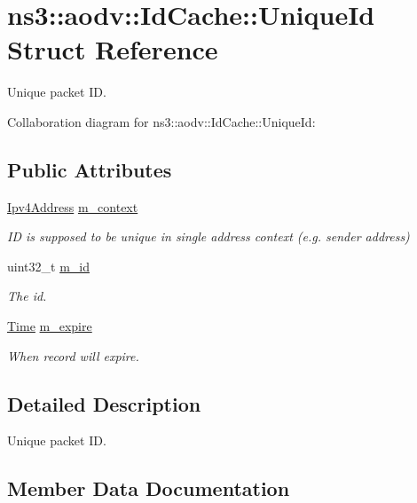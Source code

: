 \hypertarget{structns3_1_1aodv_1_1IdCache_1_1UniqueId}{}\section{ns3\+:\+:aodv\+:\+:Id\+Cache\+:\+:Unique\+Id Struct Reference}
\label{structns3_1_1aodv_1_1IdCache_1_1UniqueId}


Unique packet ID.  




Collaboration diagram for ns3\+:\+:aodv\+:\+:Id\+Cache\+:\+:Unique\+Id\+:
\subsection*{Public Attributes}
\begin{DoxyCompactItemize}
\item 
\hyperlink{classns3_1_1Ipv4Address}{Ipv4\+Address} \hyperlink{structns3_1_1aodv_1_1IdCache_1_1UniqueId_af2e1e7b547b9a93001af9237e2903011}{m\+\_\+context}
\begin{DoxyCompactList}\small\item\em ID is supposed to be unique in single address context (e.\+g. sender address) \end{DoxyCompactList}\item 
uint32\+\_\+t \hyperlink{structns3_1_1aodv_1_1IdCache_1_1UniqueId_a7436c8b104a31e26c0ce06b103045110}{m\+\_\+id}
\begin{DoxyCompactList}\small\item\em The id. \end{DoxyCompactList}\item 
\hyperlink{classns3_1_1Time}{Time} \hyperlink{structns3_1_1aodv_1_1IdCache_1_1UniqueId_a166a2c28a2a2fbbf314b47a308c5fd3d}{m\+\_\+expire}
\begin{DoxyCompactList}\small\item\em When record will expire. \end{DoxyCompactList}\end{DoxyCompactItemize}


\subsection{Detailed Description}
Unique packet ID. 

\subsection{Member Data Documentation}
